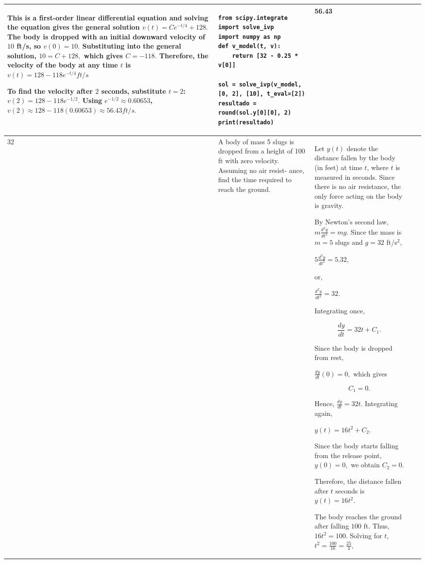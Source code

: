 \documentclass[a4paper,12pt]{article}
\begin{document}
\begin{longtable}{|p{0.3cm}|p{}|p{10cm}|p{}|p{1.5cm}|}
This is a first-order linear differential equation and solving the equation gives the  general solution $v(t)=Ce^{-t/4}+128.$
The body is dropped with an initial downward velocity of \(10\) ft/s, so
$v(0)=10.$
Substituting into the general solution,
$10=C+128,$
which gives
$
C=-118.$
Therefore, the velocity of the body at any time \(t\) is
$v(t)=128-118e^{-t/4}ft/s$

To find the velocity after \(2\) seconds, substitute \(t=2\):
$v(2)=128-118e^{-1/2}.$
Using \(e^{-1/2}\approx0.60653\),
$v(2)\approx128-118(0.60653)
      \approx56.43 ft/s.$

  &\begin{verbatim}
from scipy.integrate import solve_ivp
import numpy as np
def v_model(t, v):
    return [32 - 0.25 * v[0]]

sol = solve_ivp(v_model, [0, 2], [10], t_eval=[2])
resultado = round(sol.y[0][0], 2)
print(resultado)
\end{verbatim}&      56.43            \\ \hline


   32              &   A body of mass 5 slugs is dropped from a height of 100 ft with zero velocity. Assuming no air resist- ance, find the time required to reach the ground.              &   Let \(y(t)\) denote the distance fallen by the body (in feet) at time \(t\), where \(t\) is measured in seconds. Since there is no air resistance, the only force acting on the body is gravity.

By Newton's second law,  $m\frac{d^2y}{dt^2}=mg.$
Since the mass is \(m=5\) slugs and \(g=32\) ft/s\(^2\),

$5\frac{d^2y}{dt^2}=5 . 32,$

or, 

$\frac{d^2y}{dt^2}=32.$

Integrating once,

\[
\frac{dy}{dt}=32t+C_1.
\]

Since the body is dropped from rest,

$\frac{dy}{dt}(0)=0,$  which gives

\[
C_1=0.
\]

Hence,
$\frac{dy}{dt}=32t.$
Integrating again,

$y(t)=16t^2+C_2.$

Since the body starts falling from the release point,
$y(0)=0,$  we obtain
$C_2=0.$

Therefore, the distance fallen after \(t\) seconds is
$y(t)=16t^2.$

The body reaches the ground after falling \(100\) ft. Thus,
$16t^2=100.$
Solving for \(t\), $
t^2=\frac{100}{16}=\frac{25}{4},$


\end{longtable}
\end{document}
